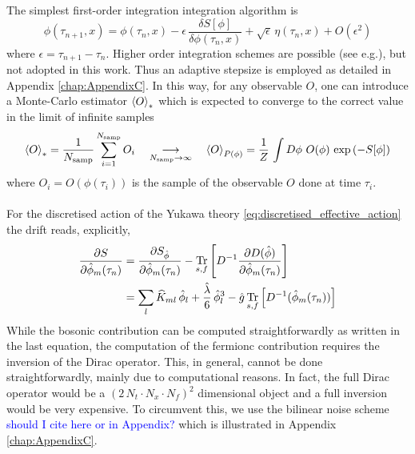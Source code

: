 The simplest first-order integration integration algorithm is \cite{ParisiWu}
\begin{equation*}
    \phi(\tau_{n+1}, x) = \phi(\tau_{n}, x) - \epsilon \,  \frac{\delta S[\phi]}{\delta \phi (\tau_n, x)} + \sqrt{\epsilon} \, \eta(\tau_n, x) + O(\epsilon^2)
\end{equation*}
where $\epsilon = \tau_{n+1} - \tau_n$. Higher order integration schemes are possible (see e.g.\cite{bilinearnoise1,Kronfeld1993}), but not adopted in this work. Thus an adaptive stepsize is employed as detailed in Appendix \ref{chap:AppendixC}.
In this way, for any observable $O$, one can introduce a Monte-Carlo estimator $\left\langle O \right\rangle_*$ which is expected to converge to the correct value in the limit of infinite samples
\begin{equation}
    \left\langle O \right\rangle_{*} = \frac{1}{N_\text{samp}} \sum^{N_\text{samp}}_{i=1} O_i \quad \underset{N_\text{samp} \to \infty}{\longrightarrow} \quad \left\langle O \right\rangle_{P(\phi)} = \frac{1}{Z} \, \int D\phi \ O(\phi) \, \exp\left(-S[\phi]\right)
    \label{eq:monte_carlo_estimator}
\end{equation}
where $O_i = O(\phi(\tau_i))$ is the sample of the observable $O$ done at time $\tau_i$. \\~\\
For the discretised action of the Yukawa theory \eqref{eq:discretised_effective_action} the drift reads, explicitly,
\begin{equation}
    \begin{aligned}
        \frac{\partial S}{\partial \hat{\phi}_m(\tau_n)} &= \frac{\partial S_{\hat{\phi}}}{\partial \hat{\phi}_m(\tau_n)} - \underset{s,f}{\operatorname{\text{Tr}}} \left[D^{-1} \frac{\partial D(\hat{\phi})}{\partial \hat{\phi}_m(\tau_n)}\right] \\
        &= \sum_l \widehat{K}_{ml} \, \hat\phi_l + \frac{\hat\lambda}{6} \, \hat\phi_l^3 - \hat g \, \underset{s,f}{\operatorname{\text{Tr}}} \left[D^{-1}(\hat{\phi}_m(\tau_n))\right]
    \end{aligned}
    \label{eq:drift_continuum_full_theory}
\end{equation}
While the bosonic contribution can be computed straightforwardly as written in the last equation, the computation of the fermionc contribution requires the inversion of the Dirac operator. This, in general, cannot be done straightforwardly, mainly due to computational reasons. 
In fact, the full Dirac operator would be a $(2 \, N_t \cdot N_x \cdot N_f)^2$ dimensional object and a full inversion would be very expensive. To circumvent this, we use the bilinear noise scheme \cite{bilinearnoise1,bilinearnoise2} \textcolor{blue}{should I cite here or in Appendix?} which is illustrated in Appendix \ref{chap:AppendixC}.




